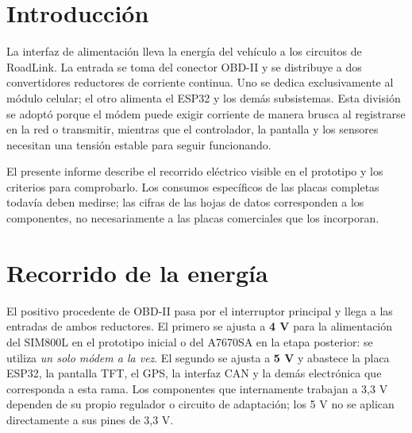 \documentclass[11pt,letterpaper]{article}
\begin{document}
\clearpage
{}

\section{Introducción}

La interfaz de alimentación lleva la energía del vehículo a los circuitos de
RoadLink. La entrada se toma del conector OBD-II y se distribuye a dos
convertidores reductores de corriente continua. Uno se dedica exclusivamente al
módulo celular; el otro alimenta el ESP32 y los demás subsistemas. Esta división
se adoptó porque el módem puede exigir corriente de manera brusca al registrarse
en la red o transmitir, mientras que el controlador, la pantalla y los sensores
necesitan una tensión estable para seguir funcionando.

El presente informe describe el recorrido eléctrico visible en el prototipo y
los criterios para comprobarlo. Los consumos específicos de las placas completas
todavía deben medirse; las cifras de las hojas de datos corresponden a los
componentes, no necesariamente a las placas comerciales que los incorporan.

\section{Recorrido de la energía}

El positivo procedente de OBD-II pasa por el interruptor principal y llega a
las entradas de ambos reductores. El primero se ajusta a \textbf{4 V} para la
alimentación del SIM800L en el prototipo inicial o del A7670SA en la etapa
posterior: se utiliza \emph{un solo módem a la vez}. El segundo se ajusta a
\textbf{5 V} y abastece la placa ESP32, la pantalla TFT, el GPS, la interfaz CAN
y la demás electrónica que corresponda a esta rama. Los componentes que
internamente trabajan a 3,3 V dependen de su propio regulador o circuito de
adaptación; los 5 V no se aplican directamente a sus pines de 3,3 V.
\end{document}
